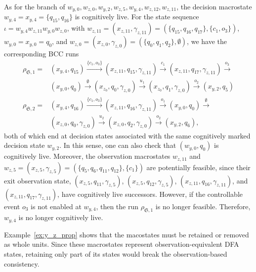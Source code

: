 \documentclass[final,5p,times,twocolumn,authoryear]{elsarticle}
\begin{document}
\begin{example}
As for the branch of $w_{y,0}, w_{z,0}, w_{y,2}, w_{z,5}, w_{y,4}, w_{z,12}, w_{z,11}$, the decision macrostate $w_{y,4} = x_{y,4} = \{ q_{15}, q_{16} \}$ is cognitively live.
For the state sequence $\iota = w_{y,4} w_{z,11} w_{y,0} w_{z,0}$, with $w_{z,11}  = (x_{z,11}, \gamma_{z, 11}) = (\{ q_{15}, q_{16}, q_{17}\}, \{c_1, o_3\})$, $w_{y,0} = x_{y,0} = {q_0}$, and $w_{z,0} = (x_{z,0}, \gamma_{z, 0}) = (\{ q_0, q_1, q_2 \}, \emptyset)$, we have the corresponding BCC runs
$$
\begin{aligned}
\rho_{\mathfrak{S}, 1} = 
&(x_{y,4}, q_{15}) \xrightarrow{\{c_1, o_3\}} (x_{z,11}, q_{15}, \gamma_{z,11}) \xrightarrow{c_1} (x_{z,11}, q_{17}, \gamma_{z, 11}) \xrightarrow{o_3} \\
&(x_{y,0}, q_0) \xrightarrow{\emptyset} (x_{z_0}, q_0, \gamma_{z,0}) \xrightarrow{u_1} (x_{z_0}, q_1, \gamma_{z,0}) \xrightarrow{o_2} (x_{y,2}, q_5) \\
\rho_{\mathfrak{S}, 2} = 
&(x_{y,4}, q_{16}) \xrightarrow{\{c_1, o_3\}} (x_{z,11}, q_{16}, \gamma_{z, 11}) \xrightarrow{o_1} (x_{y,0}, q_0) \xrightarrow{\emptyset} \\
&(x_{z,0}, q_0, \gamma_{z,0}) \xrightarrow{u_2} (x_{z,0}, q_2, \gamma_{z, 0}) \xrightarrow{o_2} (x_{y,2}, q_6),
\end{aligned}
$$
both of which end at decision states associated with the same cognitively marked decision state $w_{y,2}$.
%
In this sense, one can also check that $(w_{y,0}, q_0)$ is cognitively live.
Moreover, the observation macrostates $w_{z,11}$ and $w_{z,5} = (x_{z,5}, \gamma_{z,5}) = (\{q_5, q_6, q_{11}, q_{12}\}, \{ c_1 \})$ are potentially feasible, since their exit observation state, $(x_{z,5}, q_{11}, \gamma_{z,5})$, $(x_{z,5}, q_{12}, \gamma_{z,5})$, $(x_{z,11}, q_{16}, \gamma_{z,11})$, and $(x_{z,11}, q_{17}, \gamma_{z,11})$, have cognitively live successors.
However, if the controllable event $o_3$ is not enabled at $w_{y,4}$, then the run $\rho_{\mathfrak{S}, 1}$ is no longer feasible.
Therefore, $w_{y,4}$ is no longer cognitively live.
%  
%
%
\end{example}


%
Example~\ref{ex:y_z_prop} shows that the macostates must be retained or removed as whole units. 
Since these macrostates represent observation-equivalent DFA states, retaining only part of its states would break the observation-based consistency. 
\end{document}
